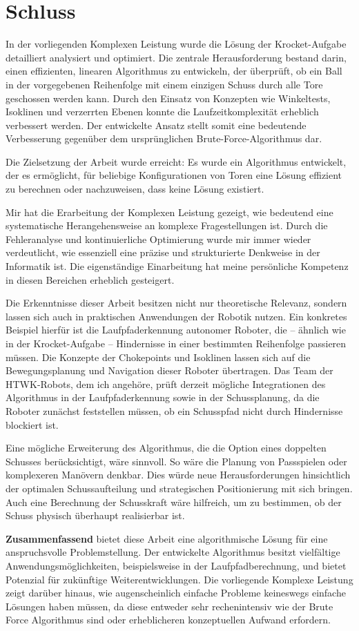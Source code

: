 \section{Schluss}

In der vorliegenden Komplexen Leistung wurde die Lösung der Krocket-Aufgabe detailliert analysiert und optimiert. Die zentrale Herausforderung bestand darin, einen effizienten, linearen Algorithmus zu entwickeln, der überprüft, ob ein Ball in der vorgegebenen Reihenfolge mit einem einzigen Schuss durch alle Tore geschossen werden kann. Durch den Einsatz von Konzepten wie Winkeltests, Isoklinen und verzerrten Ebenen konnte die Laufzeitkomplexität erheblich verbessert werden. Der entwickelte Ansatz stellt somit eine bedeutende Verbesserung gegenüber dem ursprünglichen Brute-Force-Algorithmus dar.

Die Zielsetzung der Arbeit wurde erreicht: Es wurde ein Algorithmus entwickelt, der es ermöglicht, für beliebige Konfigurationen von Toren eine Lösung effizient zu berechnen oder nachzuweisen, dass keine Lösung existiert.

Mir hat die Erarbeitung der Komplexen Leistung gezeigt, wie bedeutend eine systematische Herangehensweise an komplexe Fragestellungen ist. Durch die Fehleranalyse und kontinuierliche Optimierung wurde mir immer wieder verdeutlicht, wie essenziell eine präzise und strukturierte Denkweise in der Informatik ist. Die eigenständige Einarbeitung hat meine persönliche Kompetenz in diesen Bereichen erheblich gesteigert.

Die Erkenntnisse dieser Arbeit besitzen nicht nur theoretische Relevanz, sondern lassen sich auch in praktischen Anwendungen der Robotik nutzen. Ein konkretes Beispiel hierfür ist die Laufpfaderkennung autonomer Roboter, die – ähnlich wie in der Krocket-Aufgabe – Hindernisse in einer bestimmten Reihenfolge passieren müssen. Die Konzepte der Chokepoints und Isoklinen lassen sich auf die Bewegungsplanung und Navigation dieser Roboter übertragen. Das Team der HTWK-Robots, dem ich angehöre, prüft derzeit mögliche Integrationen des Algorithmus in der Laufpfaderkennung sowie in der Schussplanung, da die Roboter zunächst feststellen müssen, ob ein Schusspfad nicht durch Hindernisse blockiert ist.

Eine mögliche Erweiterung des Algorithmus, die die Option eines doppelten Schusses berücksichtigt, wäre sinnvoll. So wäre die Planung von Passspielen oder komplexeren Manövern denkbar. Dies würde neue Herausforderungen hinsichtlich der optimalen Schussaufteilung und strategischen Positionierung mit sich bringen. Auch eine Berechnung der Schusskraft wäre hilfreich, um zu bestimmen, ob der Schuss physisch überhaupt realisierbar ist.

\textbf{Zusammenfassend} bietet diese Arbeit eine algorithmische Lösung für eine anspruchsvolle Problemstellung. Der entwickelte Algorithmus besitzt vielfältige Anwendungsmöglichkeiten, beispielsweise in der Laufpfadberechnung, und bietet Potenzial für zukünftige Weiterentwicklungen. Die vorliegende Komplexe Leistung zeigt darüber hinaus, wie augenscheinlich einfache Probleme keineswegs einfache Lösungen haben müssen, da diese entweder sehr rechenintensiv wie der Brute Force Algorithmus sind oder erheblicheren konzeptuellen Aufwand erfordern.